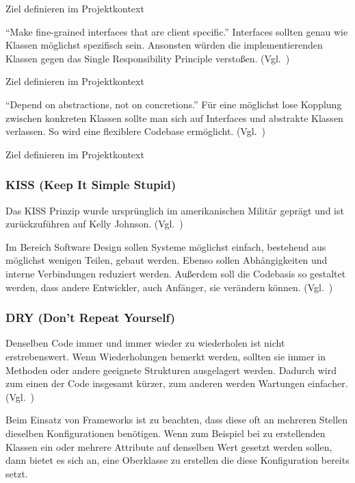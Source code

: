 \color{red}
Ziel definieren im Projektkontext
\color{black}

\enquote{Make fine-grained interfaces that are client specific.}\cite{solid}
Interfaces sollten genau wie Klassen möglichst spezifisch sein.
Ansonsten würden die implementierenden Klassen gegen das Single Responsibility Principle verstoßen.
(Vgl.~\cite{design-patterns-php-laravel})

\color{red}
Ziel definieren im Projektkontext
\color{black}

\enquote{Depend on abstractions, not on concretions.}\cite{solid}
Für eine möglichst lose Kopplung zwischen konkreten Klassen sollte man sich auf Interfaces und abstrakte Klassen verlassen.
So wird eine flexiblere Codebase ermöglicht.
(Vgl.~\cite{design-patterns-php-laravel})

\color{red}
Ziel definieren im Projektkontext
\color{black}

\newpage

\subsubsection{KISS (Keep It Simple Stupid)}
Das KISS Prinzip wurde ursprünglich im amerikanischen Militär geprägt und ist zurückzuführen auf Kelly Johnson.
(Vgl.~\cite{kelly-johnson-memoir})

Im Bereich Software Design sollen Systeme möglichst einfach, bestehend aus möglichst wenigen Teilen, gebaut werden.
Ebenso sollen Abhängigkeiten und interne Verbindungen reduziert werden.
Außerdem soll die Codebasis so gestaltet werden, dass andere Entwickler, auch Anfänger, sie verändern können.
(Vgl.~\cite{kiss-principle-explained})

\subsubsection{DRY (Don’t Repeat Yourself)}
Denselben Code immer und immer wieder zu wiederholen ist nicht erstrebenswert.
Wenn Wiederholungen bemerkt werden, sollten sie immer in Methoden oder andere geeignete Strukturen ausgelagert werden.
Dadurch wird zum einen der Code insgesamt kürzer, zum anderen werden Wartungen einfacher.
(Vgl.~\cite{the-pragmatic-programmer})

Beim Einsatz von Frameworks ist zu beachten, dass diese oft an mehreren Stellen dieselben Konfigurationen benötigen.
Wenn zum Beispiel bei zu erstellenden Klassen ein oder mehrere Attribute auf denselben Wert gesetzt werden sollen, dann bietet es sich an, eine Oberklasse zu erstellen die diese Konfiguration bereits setzt.

